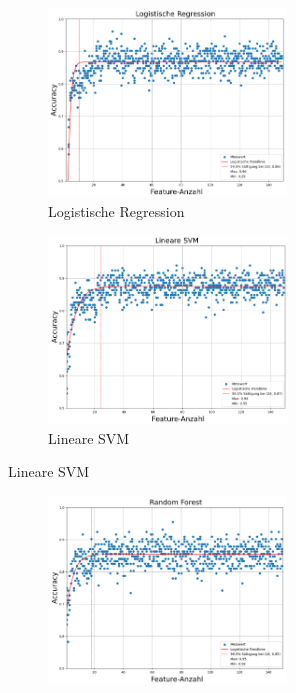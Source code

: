 \begin{figure}[p]
     \centering
     \begin{subfigure}[b]{0.9\textwidth}
         \begin{subfigure}[b]{0.49\textwidth}
             \centering
             \includegraphics[width=\textwidth, height=5cm]{img/Plots/Modell Auswahl/Logistic Regression - Accuracy Plot.png}
             \caption{Logistische Regression}
         \end{subfigure}
         \hfill
         \begin{subfigure}[b]{0.49\textwidth}
             \centering
             \includegraphics[width=\textwidth, height=5cm]{img/Plots/Modell Auswahl/Linea SVM - Accuracy Plot.png}
             \caption{Lineare SVM}
         \end{subfigure}
     \end{subfigure}
     \hfill
     \begin{subfigure}[b]{0.9\textwidth}
         \begin{subfigure}[b]{0.49\textwidth}
             \centering
             \includegraphics[width=\textwidth, height=5cm]{img/Plots/Modell Auswahl/Random Forest - Accuracy Plot.png}

\end{subfigure}
\end{subfigure}
\end{figure}
